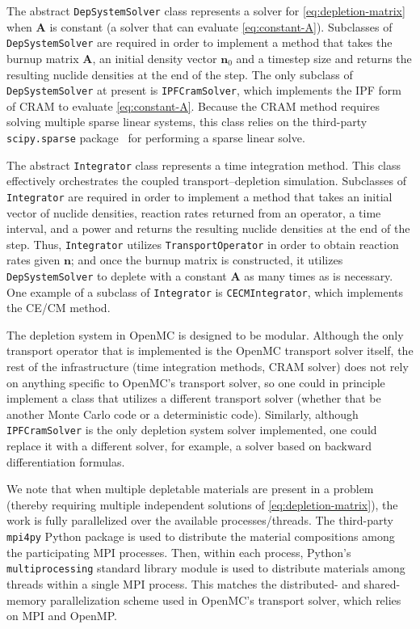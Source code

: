 \documentclass[3p,authoryear]{elsarticle}
\newcommand{\vect}[1]{\mathbf{#1}} %
\begin{document}
The abstract \texttt{DepSystemSolver} class represents a solver for
\cref{eq:depletion-matrix} when $\vect{A}$ is constant (a solver that can
evaluate \cref{eq:constant-A}). Subclasses of \texttt{DepSystemSolver} are
required in order to implement a method that takes the burnup matrix $\vect{A}$,
an initial density vector $\vect{n}_0$ and a timestep size and returns the
resulting nuclide densities at the end of the step. The only subclass of
\texttt{DepSystemSolver} at present is \texttt{IPFCramSolver}, which implements
the IPF form of CRAM to evaluate \cref{eq:constant-A}. Because the CRAM method
requires solving multiple sparse linear systems, this class relies on the
third-party \texttt{scipy.sparse} package~\citep{virtanen2020nm} for performing
a sparse linear solve.

The abstract \texttt{Integrator} class represents a time integration method.
This class effectively orchestrates the coupled transport--depletion simulation.
Subclasses of \texttt{Integrator} are required in order to implement a method
that takes an initial vector of nuclide densities, reaction rates returned from
an operator, a time interval, and a power and returns the resulting nuclide
densities at the end of the step. Thus, \texttt{Integrator} utilizes
\texttt{TransportOperator} in order to obtain reaction rates given $\vect{n}$;
and once the burnup matrix is constructed, it utilizes \texttt{DepSystemSolver}
to deplete with a constant $\vect{A}$ as many times as is necessary. One example
of a subclass of \texttt{Integrator} is \texttt{CECMIntegrator}, which
implements the CE/CM method.

The depletion system in OpenMC is designed to be modular. Although the only
transport operator that is implemented is the OpenMC transport solver itself,
the rest of the infrastructure (time integration methods, CRAM solver) does not
rely on anything specific to OpenMC's transport solver, so one could in
principle implement a class that utilizes a different transport solver (whether
that be another Monte Carlo code or a deterministic code). Similarly, although
\texttt{IPFCramSolver} is the only depletion system solver implemented, one
could replace it with a different solver, for example, a solver based on
backward differentiation formulas.

We note that when multiple depletable materials are present in a problem
(thereby requiring multiple independent solutions of
\cref{eq:depletion-matrix}), the work is fully parallelized over the available
processes/threads. The third-party \texttt{mpi4py} Python package is used to
distribute the material compositions among the participating MPI processes.
Then, within each process, Python's \texttt{multiprocessing} standard library
module is used to distribute materials among threads within a single MPI
process. This matches the distributed- and shared-memory parallelization scheme
used in OpenMC's transport solver, which relies on MPI and OpenMP.
\end{document}
